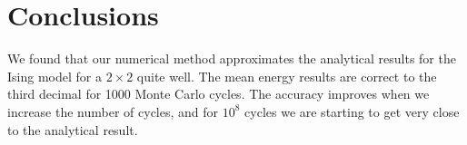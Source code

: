 \documentclass[a4paper, fontsize=11pt]{article}
\begin{document}

\section{Conclusions}

We found that our numerical method approximates the analytical results for the Ising model for a $2 \times 2$ quite well. The mean energy results are correct to the third decimal for 1000 Monte Carlo cycles. The accuracy improves when we increase the number of cycles, and for $10^8$ cycles we are starting to get very close to the analytical result.




\end{document}
